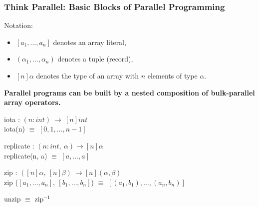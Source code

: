\documentclass[rgb,dvipsnames]{beamer}
\renewcommand{\emph}[1]{\textcolor{structure}{#1}}
\newcommand{\emp}[1]{\textcolor{DikuRed}{ #1}}
\newcommand{\emphh}[1]{\textcolor{CosGreen}{ #1}}
\begin{document}
\begin{frame}[fragile,t]
   \frametitle{Think Parallel: Basic Blocks of Parallel Programming}

Notation: 
\begin{itemize}
    \item $[a_1,\ldots,a_n]$ denotes an array literal,
    \item $(\alpha_1,\ldots,\alpha_n)$ denotes a tuple (record),
    \item $[n]\alpha$ denotes the type of an array with $n$ elements of type $\alpha$.
\end{itemize}
\bigskip

\emph{\bf Parallel programs can be built by a nested composition of bulk-parallel array operators.} 

\bigskip


\emphh{iota : $(n:int) \ \rightarrow \ [n]int$}\\
\emphh{iota}(n) $\equiv$ $[0, 1, \ldots, n-1]$\\\bigskip

\emphh{replicate} : $(n:int, \ \alpha) \rightarrow [n]\alpha$\\
\emphh{replicate}(n, a) $\equiv$ $[a, \ldots, a]$\\\bigskip

\emphh{zip} : $([n]\alpha, \ [n]\beta) \ \rightarrow [n](\alpha,\beta)$\\
\emphh{zip} ($[a_1, \ldots, a_n], \ [b_1, \ldots, b_n]$) $\equiv$ $[(a_1,b_1), \ldots, (a_n,b_n)]$\\\bigskip

\emphh{unzip} $\equiv$ zip$^{-1}$



%

\end{frame}
\end{document}
